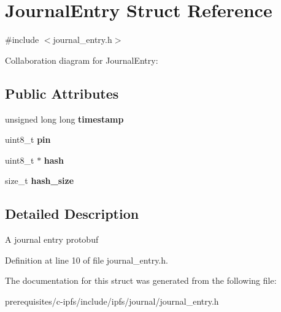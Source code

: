 \hypertarget{struct_journal_entry}{}\section{Journal\+Entry Struct Reference}
\label{struct_journal_entry}


{\ttfamily \#include $<$journal\+\_\+entry.\+h$>$}



Collaboration diagram for Journal\+Entry\+:
\subsection*{Public Attributes}
\begin{DoxyCompactItemize}
\item 
\mbox{\label{struct_journal_entry_ada0b3e45f133d2faabee7f6dba429f30}} 
unsigned long long {\bfseries timestamp}
\item 
\mbox{\label{struct_journal_entry_a6cb117f97b7b57ef7cc0c1f901347d1c}} 
uint8\+\_\+t {\bfseries pin}
\item 
\mbox{\label{struct_journal_entry_a1221ae78e1b6649247cc5fbca2493727}} 
uint8\+\_\+t $\ast$ {\bfseries hash}
\item 
\mbox{\label{struct_journal_entry_a8c7d60ffd702c1450c80a4f635f7cb74}} 
size\+\_\+t {\bfseries hash\+\_\+size}
\end{DoxyCompactItemize}


\subsection{Detailed Description}
A journal entry protobuf 

Definition at line 10 of file journal\+\_\+entry.\+h.



The documentation for this struct was generated from the following file\+:\begin{DoxyCompactItemize}
\item 
prerequisites/c-\/ipfs/include/ipfs/journal/journal\+\_\+entry.\+h\end{DoxyCompactItemize}
